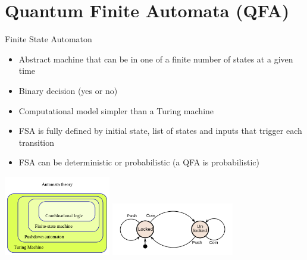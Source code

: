 \documentclass[aspectratio=169,9pt]{beamer}
\begin{document}
\section{Quantum Finite Automata (QFA)}
\begin{frame}[t]{Finite State Automaton}
  \begin{itemize}
    \item Abstract machine that can be in one of a finite number of states at a given time
    \item Binary decision (yes or no)
    \item Computational model simpler than a Turing machine
    \item FSA is fully defined by initial state, list of states and inputs that trigger each transition
    \item FSA can be deterministic or probabilistic (a QFA is probabilistic)
  \end{itemize}
  \includegraphics[width=0.35\textwidth]{Automata_hierarchy.png}
  \includegraphics[width=0.4\textwidth]{turnstile.png}
\end{frame}
\end{document}
